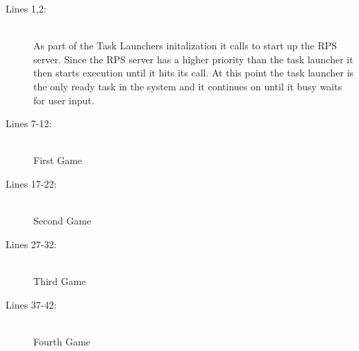 \documentclass[pdftex,10pt,a4paper]{article}
\begin{document}
\begin{description}
\item[Lines 1,2:] \hfill \\
As part of the Task Launchers initalization it calls  to
start up the RPS server. Since the RPS server has a higher priority
than the task launcher it then starts execution until it hits its
 call. At this point the task launcher is the only
ready task in the system and it continues on until it busy waits for
user input.

\item[Lines 7-12:] \hfill \\
First Game

\item[Lines 17-22:] \hfill \\
Second Game

\item[Lines 27-32:] \hfill \\
Third Game

\item[Lines 37-42:] \hfill \\
Fourth Game
\end{description}
\end{document}
